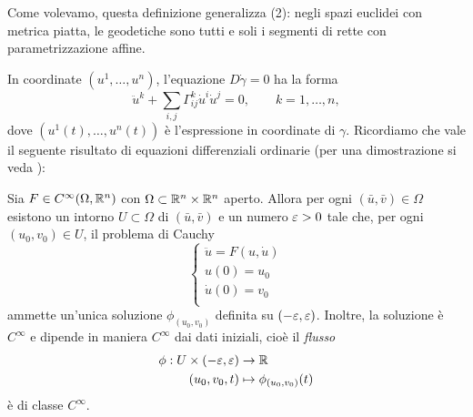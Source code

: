 	Come volevamo, questa definizione generalizza (2): negli spazi euclidei con metrica piatta, le geodetiche sono tutti e soli i segmenti di rette con parametrizzazione affine.
	
	In coordinate \((u^1, \dots, u^n)\), l'equazione \(D\dot \gamma = 0\) ha la forma
	\begin{equation}\label{eq: equazione geodetiche}
		\ddot u^k +\sum_{i,j} \Gamma_{ij}^k \dot u^i \dot u^j = 0, \qquad k=1,\dots , n,
	\end{equation}
	dove \((u^1(t), \dots, u^n(t))\) è l'espressione in coordinate di \(\gamma\). Ricordiamo che vale il seguente risultato di equazioni differenziali ordinarie (per una dimostrazione si veda \cite[Theorem X a pag. 154 e Thereom XIII a pag. 157]{walter1998ordinary}):
	\begin{teo}\label{teo: esistenza e unicità locale sol pbm Cauchy}
		Sia \(F \in C^\infty(\Omega, \mathbb{R}^n)\) con \(\Omega \subset \mathbb{R}^n \times \mathbb{R}^n\) aperto. Allora per ogni \((\bar{u}, \bar{v}) \in \Omega\) esistono un intorno \(U \subset \Omega\) di \((\bar{u},\bar{v})\) e un numero \(\varepsilon>0\) tale che, per ogni \((u_0, v_0) \in U\), il problema di Cauchy
		\[\begin{cases*}
			\ddot u = F(u,\dot u) \\
			u(0)=u_0 \\
			\dot{u}(0) = v_0\\
		\end{cases*}
		\] 
		ammette un'unica soluzione \(\phi_{(u_0, v_0)}\) definita su \((-\varepsilon,\varepsilon)\). Inoltre, la soluzione è \(C^\infty\) e dipende in maniera \(C^\infty\) dai dati iniziali, cioè il \textit{flusso}
		\begin{align*}
			\phi: U \times (-\varepsilon,\varepsilon) & \to \mathbb{R} \\
			(u_0,v_0,t) & \mapsto \phi_{(u_0,v_0)}(t)
		\end{align*}
		è di classe \(C^\infty\).
	\end{teo}

